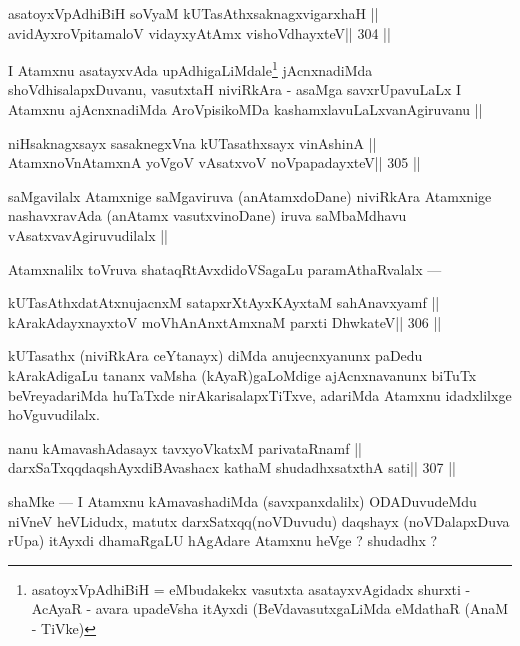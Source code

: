 \begin{shl}
asatoyxVpAdhiBiH soV\s yaM kUTasAthxsaknagxvigarxhaH ||
avidAyxroVpitamaloV vidayxyA\s\s tAmx vishoVdhayxteV\hfill || 304 ||
\end{shl}

\begin{artha}
I Atamxnu asatayxvAda upAdhigaLiMdale\footnote[1]{asatoyxVpAdhiBiH = eMbudakekx vasutxta asatayxvAgidadx shurxti - AcAyaR - avara upadeVsha itAyxdi (BeVdavasutxgaLiMda eMdathaR (AnaM - TiVke)} jAcnxnadiMda shoVdhisalapxDuvanu, vasutxtaH niviRkAra - asaMga savxrUpavuLaLx I Atamxnu ajAcnxnadiMda AroVpisikoMDa kashamxlavuLaLxvanAgiruvanu ||
\end{artha}

\begin{shl}
niHsaknagxsayx sasaknegxVna kUTasathxsayx vinAshinA ||
AtamxnoV\s nAtamxnA yoVgoV vAsatxvoV noVpapadayxteV\hfill || 305 ||
\end{shl}

\begin{artha}
saMgavilalx Atamxnige saMgaviruva (anAtamxdoDane) niviRkAra Atamxnige nashavxravAda (anAtamx vasutxvinoDane) iruva saMbaMdhavu vAsatxvavAgiruvudilalx ||
\end{artha}

\begin{artha}
Atamxnalilx toVruva shataqRtAvxdidoVSagaLu paramAthaRvalalx ---
\end{artha}

\begin{shl}
kUTasAthxdatAtxnujacnxM satapxrXtAyxKAyxtaM sahAnavxyamf ||
kArakAdayxnayxtoV moVhAnAnx\s\s tAmxnaM parxti DhwkateV\hfill || 306 ||
\end{shl}

\begin{artha}
kUTasathx (niviRkAra ceYtanayx) diMda anujecnxyanunx paDedu kArakAdigaLu tananx vaMsha (kAyaR)gaLoMdige ajAcnxnavanunx biTuTx beVreyadariMda huTaTxde nirAkarisalapxTiTxve, adariMda Atamxnu idadxlilxge hoVguvudilalx.
\end{artha}

\begin{shl}
nanu kAmavashAdasayx tavxyoVkatxM parivataRnamf ||
darxSaTxqqdaqshAyxdiBAvashacx kathaM shudadhxsatxthA sati\hfill || 307 ||
\end{shl}

\begin{artha}
shaMke --- I Atamxnu kAmavashadiMda (savxpanxdalilx) ODADuvudeMdu niVneV heVLidudx, matutx darxSatxqq(noVDuvudu) daqshayx (noVDalapxDuva rUpa) itAyxdi dhamaRgaLU hAgAdare Atamxnu heVge ? shudadhx ?
\end{artha}

